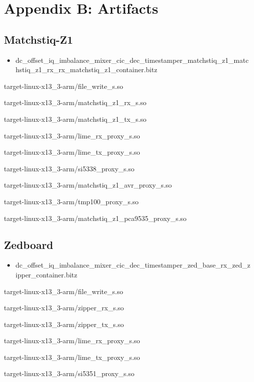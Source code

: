 \documentclass{article}
\begin{document}
\section{Appendix B: Artifacts}
\subsection{Matchstiq-Z1}
	\begin{itemize}
	\item dc\_offset\_iq\_imbalance\_mixer\_cic\_dec\_timestamper\_matchstiq\_z1\_matchstiq\_z1\_rx\_rx\_matchstiq\_z1\_container.bitz
	\end{itemize}
	\begin{itemize}
	\begin{minipage}[t]{.5\textwidth}
	\item target-linux-x13\_3-arm/file\_write\_s.so
	\item target-linux-x13\_3-arm/matchstiq\_z1\_rx\_s.so
	\item target-linux-x13\_3-arm/matchstiq\_z1\_tx\_s.so
	\item target-linux-x13\_3-arm/lime\_rx\_proxy\_s.so
	\item target-linux-x13\_3-arm/lime\_tx\_proxy\_s.so
	\end{minipage}
	\begin{minipage}[t]{.5\textwidth}
	\item target-linux-x13\_3-arm/si5338\_proxy\_s.so
	\item target-linux-x13\_3-arm/matchstiq\_z1\_avr\_proxy\_s.so
	\item target-linux-x13\_3-arm/tmp100\_proxy\_s.so
	\item target-linux-x13\_3-arm/matchstiq\_z1\_pca9535\_proxy\_s.so
	\end{minipage}
	\end{itemize}
\subsection{Zedboard}
	\begin{itemize}
	\item dc\_offset\_iq\_imbalance\_mixer\_cic\_dec\_timestamper\_zed\_base\_rx\_zed\_zipper\_container.bitz
	\end{itemize}
	\begin{itemize}
	\begin{minipage}[t]{.5\textwidth}
	\item target-linux-x13\_3-arm/file\_write\_s.so
	\item target-linux-x13\_3-arm/zipper\_rx\_s.so
	\item target-linux-x13\_3-arm/zipper\_tx\_s.so
	\end{minipage}
	\begin{minipage}[t]{.5\textwidth}
	\item target-linux-x13\_3-arm/lime\_rx\_proxy\_s.so
	\item target-linux-x13\_3-arm/lime\_tx\_proxy\_s.so
	\item target-linux-x13\_3-arm/si5351\_proxy\_s.so
	\end{minipage}
	\end{itemize}
\end{document}
